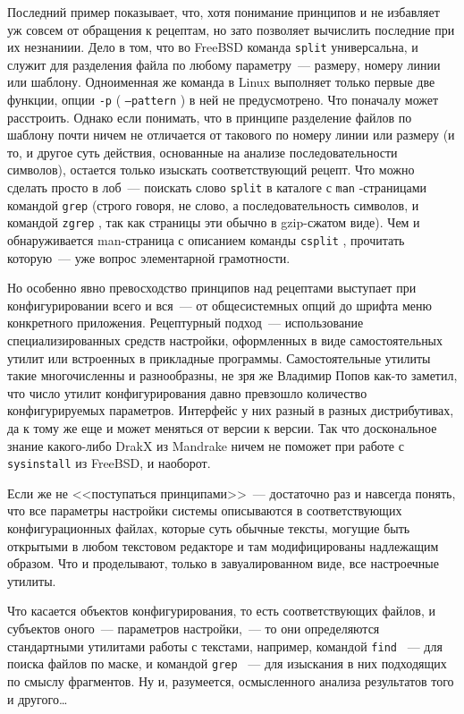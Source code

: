Последний пример показывает, что, хотя понимание принципов и не избавляет уж совсем от обращения к рецептам, но зато позволяет вычислить последние при их незнаниии. Дело в том, что во FreeBSD команда 
\texttt{split}
 универсальна, и служит для разделения файла по любому параметру~--- размеру, номеру линии или шаблону. Одноименная же команда в Linux выполняет только первые две функции, опции 
\texttt{-p}
 (
\texttt{--pattern}
) в ней не предусмотрено. Что поначалу может расстроить. Однако если понимать, что в принципе разделение файлов по шаблону почти ничем не отличается от такового по номеру линии или размеру (и то, и другое суть действия, основанные на анализе последовательности символов), остается только изыскать соответствующий рецепт. Что можно сделать просто в лоб~--- поискать слово 
\texttt{split}
 в каталоге с 
\texttt{man}
-страницами командой 
\texttt{grep}
 (строго говоря, не слово, а последовательность символов, и командой 
\texttt{zgrep}
, так как страницы эти обычно в gzip-сжатом виде). Чем и обнаруживается man-страница с описанием команды 
\texttt{csplit}
, прочитать которую~--- уже вопрос элементарной грамотности.

Но особенно явно превосходство принципов над рецептами выступает при конфигурировании всего и вся~--- от общесистемных опций до шрифта меню конкретного приложения. Рецептурный подход~--- использование специализированных средств настройки, оформленных в виде самостоятельных утилит или встроенных в прикладные программы. Самостоятельные утилиты такие многочисленны и разнообразны, не зря же Владимир Попов как-то заметил, что число утилит конфигурирования давно превзошло количество конфигурируемых параметров. Интерфейс у них разный в разных дистрибутивах, да к тому же еще и может меняться от версии к версии. Так что доскональное знание какого-либо DrakX из Mandrake ничем не поможет при работе с 
\texttt{sysinstall}
 из FreeBSD, и наоборот.

Если же не <<поступаться принципами>>~--- достаточно раз и навсегда понять, что все параметры настройки системы описываются в соответствующих конфигурационных файлах, которые суть обычные тексты, могущие быть открытыми в любом текстовом редакторе и там модифицированы надлежащим образом. Что и проделывают, только в завуалированном виде, все настроечные утилиты.

Что касается объектов конфигурирования, то есть соответствующих файлов, и субъектов оного~--- параметров настройки,~--- то они определяются стандартными утилитами работы с текстами, например, командой 
\texttt{find}
~--- для поиска файлов по маске, и командой 
\texttt{grep}
~--- для изыскания в них подходящих по смыслу фрагментов. Ну и, разумеется, осмысленного анализа результатов того и другого\dots

